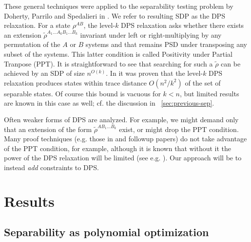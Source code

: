 \documentclass[aps,pra,notitlepage,preprintnumbers,11pt,tightenlines]{revtex4-1}
\begin{document}
These general techniques were applied to the separability testing
problem by Doherty, Parrilo and Spedalieri in \cite{dps:2003}.
We refer to resulting SDP as the DPS relaxation.  For a state
$\rho^{AB}$, the level-$k$ DPS relaxation asks whether there exists an
extension $\tilde\rho^{A_1 \ldots A_k B_1 \ldots B_k}$ invariant under
left or right-multiplying by any permutation of the $A$ or $B$
systems and that remains PSD under transposing any subset of the
systems.  This latter condition is called Positivity under Partial
Tranpose (PPT).  It is straightforward to see that searching for such
a $\tilde\rho$ can be achieved by an SDP of size $n^{O(k)}$.  In
\cite{NOP09} it was proven that the level-$k$ DPS relaxation produces
states within trace distance $O(n^2/k^2)$ of the set of separable
states.  Of course this bound is vacuous for $k < n$, but limited
results are known in this case as well; cf. the discussion in~
\ref{sec:previous-sep}.
 
Often weaker forms of DPS are analyzed.  For example, we might demand
only that an extension of the form $\tilde \rho^{AB_1\ldots B_k}$
exist, or might drop the PPT condition.  Many proof techniques
(e.g. those in \cite{brandao11} and followup papers) do not take
advantage of the PPT condition, for example, although it is known that
without it the power of the DPS relaxation will be limited (see
e.g. \cite{BuhrmanRSW11}).  Our approach will be to instead {\em add}
constraints to DPS.

\section{Results}\label{sec:results}
\subsection{Separability as polynomial optimization}
\end{document}

